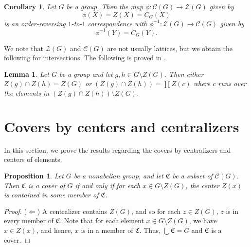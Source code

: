 \documentclass[12pt]{amsart}
\newtheorem{corollary}[theorem]{Corollary}
\newtheorem{proposition}[theorem]{Proposition}
\newtheorem{lemma}[theorem]{Lemma}
\begin{document}
{\begin{corollary}\label{lem:corres}
Let $G$ be a group. 
Then the map $\phi : \mathcal {C} (G) \rightarrow \mathcal {Z} (G)$ given by 
$$\phi(X) = Z (X) = C_G (X)$$
is an order-reversing $1$-to-$1$ correspondence with $\phi^{-1} : \mathcal {Z} (G) \rightarrow \mathcal {C} (G)$ given by $$\phi^{-1} (Y) = {C}_G (Y).$$
\end{corollary}

We note that $\mathcal {Z} (G)$ and $\mathcal {C} (G)$ are not usually lattices, but we obtain the following for intersections.  The following is proved in \cite{centgraph}.

\begin{lemma} \label{intersection}
Let $G$ be a group and let $g, h \in G \setminus Z(G)$.   Then either $Z(g) \cap Z(h) = Z(G)$ or $(Z(g) \cap Z(h)) = \prod Z(c)$ where $c$ runs over the elements in $(Z (g) \cap Z(h)) \setminus Z(G)$.
\end{lemma}

\section {Covers by centers and centralizers}

In this section, we prove the results regarding the covers by centralizers and centers of elements.


\begin{proposition}\label{prop:cover_contain_z}
Let $G$ be a nonabelian group, and let $\mathfrak{C}$ be a subset of $\mathcal{C} (G)$.  Then $\mathfrak{C}$ is a cover of $G$ if and only if for each $x \in G \setminus {Z}(G)$, the center ${Z}(x)$ is contained in some member of $\mathfrak{C}$.
\end{proposition}

\begin{proof}
($\Leftarrow$) A centralizer contains ${Z}(G)$, and so for each $z \in {Z}(G)$, $z$ is in every member of $\mathfrak{C}$.  Note that for each element $x \in G \setminus {Z}(G)$, we have $x \in {Z}(x)$, and hence, $x$ is in a member of $\mathfrak{C}$.  Thus, $\bigcup \mathfrak{C} = G$ and $\mathfrak{C}$ is a cover.
	

\end{proof}}
\end{document}
